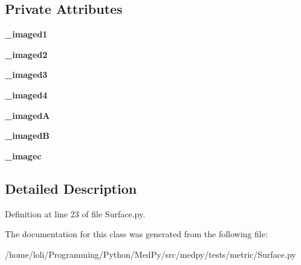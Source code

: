 \subsection*{Private Attributes}
\begin{DoxyCompactItemize}
\item 
\hypertarget{classmedpy_1_1tests_1_1metric_1_1Surface_1_1TestSurfaceClass_acfe84a31bc62cc25d6fbf8bc845ccbea}{
{\bfseries \_\-imaged1}}
\label{classmedpy_1_1tests_1_1metric_1_1Surface_1_1TestSurfaceClass_acfe84a31bc62cc25d6fbf8bc845ccbea}

\item 
\hypertarget{classmedpy_1_1tests_1_1metric_1_1Surface_1_1TestSurfaceClass_a3a713da5b07b2d172a90962cc4e6e14d}{
{\bfseries \_\-imaged2}}
\label{classmedpy_1_1tests_1_1metric_1_1Surface_1_1TestSurfaceClass_a3a713da5b07b2d172a90962cc4e6e14d}

\item 
\hypertarget{classmedpy_1_1tests_1_1metric_1_1Surface_1_1TestSurfaceClass_a461ec637a55c5e33ff55224fbeba6a2e}{
{\bfseries \_\-imaged3}}
\label{classmedpy_1_1tests_1_1metric_1_1Surface_1_1TestSurfaceClass_a461ec637a55c5e33ff55224fbeba6a2e}

\item 
\hypertarget{classmedpy_1_1tests_1_1metric_1_1Surface_1_1TestSurfaceClass_a16ae600222aca4f6201cc25f89543147}{
{\bfseries \_\-imaged4}}
\label{classmedpy_1_1tests_1_1metric_1_1Surface_1_1TestSurfaceClass_a16ae600222aca4f6201cc25f89543147}

\item 
\hypertarget{classmedpy_1_1tests_1_1metric_1_1Surface_1_1TestSurfaceClass_ae23c90322f0c7fb8b87b8e9753faf3e7}{
{\bfseries \_\-imagedA}}
\label{classmedpy_1_1tests_1_1metric_1_1Surface_1_1TestSurfaceClass_ae23c90322f0c7fb8b87b8e9753faf3e7}

\item 
\hypertarget{classmedpy_1_1tests_1_1metric_1_1Surface_1_1TestSurfaceClass_a9e3a1a65426aac370c8f6bc80c28193f}{
{\bfseries \_\-imagedB}}
\label{classmedpy_1_1tests_1_1metric_1_1Surface_1_1TestSurfaceClass_a9e3a1a65426aac370c8f6bc80c28193f}

\item 
\hypertarget{classmedpy_1_1tests_1_1metric_1_1Surface_1_1TestSurfaceClass_a01f51878ec1814e833fc8e4df639b11d}{
{\bfseries \_\-imagec}}
\label{classmedpy_1_1tests_1_1metric_1_1Surface_1_1TestSurfaceClass_a01f51878ec1814e833fc8e4df639b11d}

\end{DoxyCompactItemize}


\subsection{Detailed Description}


Definition at line 23 of file Surface.py.



The documentation for this class was generated from the following file:\begin{DoxyCompactItemize}
\item 
/home/loli/Programming/Python/MedPy/src/medpy/tests/metric/Surface.py\end{DoxyCompactItemize}
